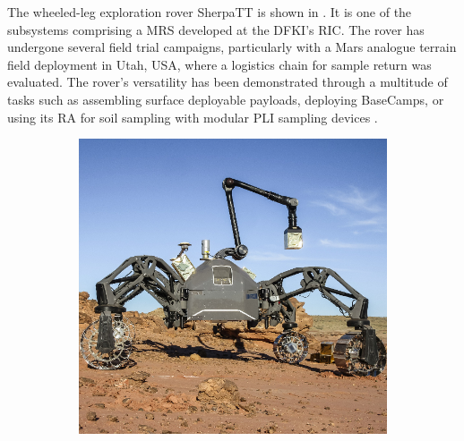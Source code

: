 The wheeled-leg exploration rover SherpaTT is shown in . It is one of the subsystems comprising a \ac{MRS} developed at the \ac{DFKI}'s \ac{RIC}. The rover has undergone several field trial campaigns, particularly with a Mars analogue terrain field deployment  in Utah, USA, where a logistics chain for sample return was evaluated. The rover's versatility has been demonstrated through a multitude of tasks such as assembling surface deployable payloads, deploying BaseCamps, or using its \ac{RA} for soil sampling with modular \ac{PLI} sampling devices .

\vspace{0.4cm}

\begin{figure}[h]
\captionsetup[subfigure]{justification=centering}
\centering
    \setlength{\subfigureWidth}{0.50\textwidth}
    \setlength{\graphicsHeight}{65mm}
    \hypersetup{hidelinks=true}%
    \begin{subfigure}[t]{\subfigureWidth}
        \centering
            \includegraphics[height=\graphicsHeight]{sections/introduction/background/images/sherpa-tt.png}
            \label{fig:sherpatt}
    \end{subfigure}\hfill

\end{figure}
